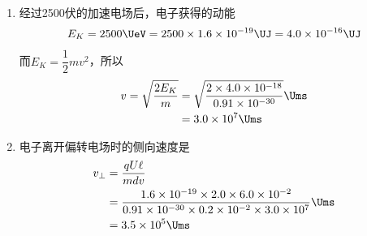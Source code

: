 \begin{solution}
\begin{enumerate}
\item 
经过2500伏的加速电场后，电子获得的动能
\[E_K=2500 \UeV =2500\times1.6\times10^{-19} \UJ=4.0\times10^{-16} \UJ \]
而$E_K=\dfrac{1}{2}mv^2$，所以
\[\begin{split}
	v=\sqrt{\frac{2E_K}{m}}&=\sqrt{\frac{2\times 4.0\times 10^{-18}}{0.91\times 10^{-30}}}\Ums\\
	&=3.0\times 10^7\Ums
\end{split} \]    

\item 
电子离开偏转电场时的侧向速度是
\[\begin{split}
	v_{\bot}&=\frac{qU\ell}{mdv}\\
	&=\frac{1.6\times10^{-19}\times2.0\times6.0\times10^{-2}}{0.91\times10^{-30}\times0.2\times10^{-2}\times3.0\times10^{7}} \Ums\\
	&=3.5\times 10^5\Ums
\end{split} \]    
\end{enumerate}
\end{solution}

